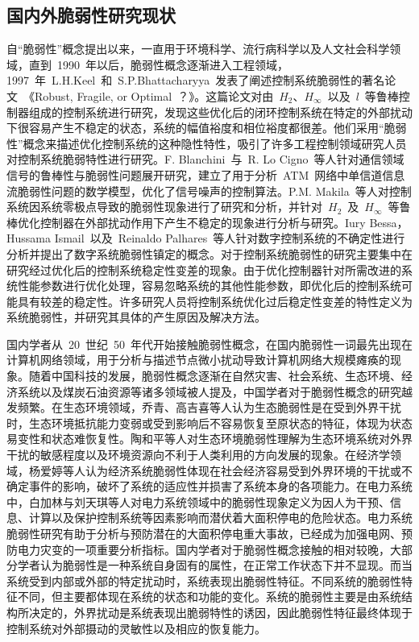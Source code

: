 \subsection{国内外脆弱性研究现状}
自“脆弱性”概念提出以来，一直用于环境科学、流行病科学以及人文社会科学领域，直到~1990~年以后，脆弱性概念逐渐进入工程领域，1997~年~L.H.Keel~和~S.P.Bhattacharyya~发表了阐述控制系统脆弱性的著名论文~\raisebox{0.5mm}{------}《Robust, Fragile, or Optimal~？》\cite{Keel1997}。这篇论文对由~$H_2$、$H_{\infty}$~以及~$l$~等鲁棒控制器组成的控制系统进行研究，发现这些优化后的闭环控制系统在特定的外部扰动下很容易产生不稳定的状态，系统的幅值裕度和相位裕度都很差。他们采用“脆弱性”概念来描述优化控制系统的这种隐性特性，吸引了许多工程控制领域研究人员对控制系统脆弱特性进行研究。F. Blanchini~与~R. Lo Cigno~等人针对通信领域信号的鲁棒性与脆弱性问题展开研究，建立了用于分析~ATM~网络中单信道信息流脆弱性问题的数学模型，优化了信号噪声的控制算法\cite{Blanchini1998Control}。P.M. Makila~等人对控制系统因系统零极点导致的脆弱性现象进行了研究和分析，并针对~$H_2$~及~$H_{\infty}$~等鲁棒优化控制器在外部扰动作用下产生不稳定的现象进行分析与研究\cite{Makila1999Fragility}。Iury Bessa，Hussama Ismail~以及~Reinaldo Palhares~等人针对数字控制系统的不确定性进行分析并提出了数字系统脆弱性镇定的概念\cite{Bessa2017Formal}。对于控制系统脆弱性的研究主要集中在研究经过优化后的控制系统稳定性变差的现象。由于优化控制器针对所需改进的系统性能参数进行优化处理，容易忽略系统的其他性能参数，即优化后的控制系统可能具有较差的稳定性。许多研究人员将控制系统优化过后稳定性变差的特性定义为系统脆弱性，并研究其具体的产生原因及解决方法。

国内学者从~20~世纪~50~年代开始接触脆弱性概念，在国内脆弱性一词最先出现在计算机网络领域，用于分析与描述节点微小扰动导致计算机网络大规模瘫痪的现象\cite{Dong2003Computerfragile}。随着中国科技的发展，脆弱性概念逐渐在自然灾害、社会系统、生态环境、经济系统以及煤炭石油资源等诸多领域被人提及，中国学者对于脆弱性概念的研究越发频繁。在生态环境领域，乔青、高吉喜等人认为生态脆弱性是在受到外界干扰时，生态环境抵抗能力变弱或受到影响后不容易恢复至原状态的特征，体现为状态易变性和状态难恢复性\cite{QIAO2008}。陶和平等人对生态环境脆弱性理解为生态环境系统对外界干扰的敏感程度以及环境资源向不利于人类利用的方向发展的现象\cite{Tao2006}。在经济学领域，杨爱婷等人认为经济系统脆弱性体现在社会经济容易受到外界环境的干扰或不确定事件的影响，破坏了系统的适应性并损害了系统本身的各项能力\cite{Yang2012}。在电力系统中，白加林与刘天琪等人对电力系统领域中的脆弱性现象定义为因人为干预、信息、计算以及保护控制系统等因素影响而潜伏着大面积停电的危险状态\cite{Bai2008PowerSystemfragile}。电力系统脆弱性研究有助于分析与预防潜在的大面积停电重大事故，已经成为加强电网、预防电力灾变的一项重要分析指标。国内学者对于脆弱性概念接触的相对较晚，大部分学者认为脆弱性是一种系统自身固有的属性，在正常工作状态下并不显现。而当系统受到内部或外部的特定扰动时，系统表现出脆弱性特征。不同系统的脆弱性特征不同，但主要都体现在系统的状态和功能的变化。系统的脆弱性主要是由系统结构所决定的，外界扰动是系统表现出脆弱特性的诱因，因此脆弱性特征最终体现于控制系统对外部摄动的灵敏性以及相应的恢复能力。
